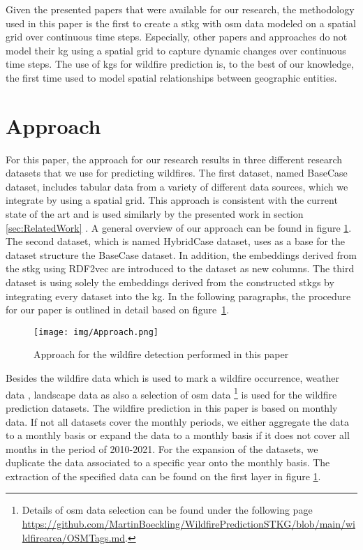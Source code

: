 \documentclass[
]{ceurart}
\begin{document}
Given the presented papers that were available for our research, the methodology used in this paper is the first to create a \gls*{stkg} with \gls*{osm} data modeled on a spatial grid over continuous time steps. Especially, other papers and approaches do not model their \gls*{kg} using a spatial grid to capture dynamic changes over continuous time steps. The use of \glspl*{kg} for wildfire prediction is, to the best of our knowledge, the first time used to model spatial relationships between geographic entities. %

\section{Approach} \label{cha:Approach}
For this paper, the approach for our research results in three different research datasets that we use for predicting wildfires. The first dataset, named BaseCase dataset, includes tabular data from a variety of different data sources, which we integrate by using a spatial grid. This approach is consistent with the current state of the art and is used similarly by the presented work in section \ref{sec:RelatedWork} \cite{Nami.2018, Kim.2019}. A general overview of our approach can be found in figure \ref{fig:Approach}. The second dataset, which is named HybridCase dataset, uses as a base for the dataset structure the BaseCase dataset. In addition, the embeddings derived from the \gls*{stkg} using RDF2vec are introduced to the dataset as new columns. The third dataset is using solely the embeddings derived from the constructed \glspl*{stkg} by integrating every dataset into the \gls*{kg}. In the following paragraphs, the procedure for our paper is outlined in detail based on figure~\ref{fig:Approach}.

\begin{figure}[ht]
	\centering
	\texttt{[image: img/Approach.png]}
	\caption{Approach for the wildfire detection performed in this paper}
	\label{fig:Approach}
\end{figure}

Besides the wildfire data \cite{Giglio.2015} which is used to mark a wildfire occurrence, weather data \cite{Menne.2012}, landscape data \cite{Yang.2018} as also a selection of \gls*{osm} data \cite{OpenStreetMapcontributors.2017}\footnote{Details of \gls*{osm} data selection can be found under the following page \url{https://github.com/MartinBoeckling/WildfirePredictionSTKG/blob/main/wildfirearea/OSMTags.md}.} is used for the wildfire prediction datasets. The wildfire prediction in this paper is based on monthly data. If not all datasets cover the monthly periods, we either aggregate the data to a monthly basis or expand the data to a monthly basis if it does not cover all months in the period of 2010-2021. For the expansion of the datasets, we duplicate the data associated to a specific year onto the monthly basis. The extraction of the specified data can be found on the first layer in figure \ref{fig:Approach}.
\end{document}
